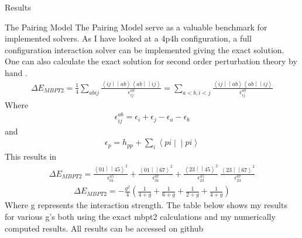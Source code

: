 \documentclass[twoside,english]{uiofysmaster}
\begin{document}
\begin{chapter}{Results}
	
	\begin{section}{The Pairing Model}
		The Pairing Model serve as a valuable benchmark for implemented solvers. As I have looked at a 4p4h configuration, a full configuration interaction solver can be implemented giving the exact solution. One can also calculate the exact solution for second order perturbation theory by hand \cite{Hjorth-Jensen2016}. 
		\begin{align}
			\Delta E_{MBPT2} = \frac{1}{4} \sum_{abij} \frac{\left<ij\middle|\middle|ab\right>\left<ab\middle|\middle|ij\right>}{\epsilon_{ij}^{ab}} = 
			\sum_{a<b,i<j} \frac{\left<ij\middle|\middle|ab\right>\left<ab\middle|\middle|ij\right>}{\epsilon_{ij}^{ab}}
		\end{align}
		Where 
		\begin{align}
			\epsilon_{ij}^{ab} = \epsilon_i + \epsilon_j - \epsilon_a - \epsilon_b
		\end{align}
		and
		\begin{align}
			\epsilon_p = h_{pp} + \sum_i \left<pi\middle|\middle|pi\right>
		\end{align}
		This results in
		\begin{align}
			\Delta E_{MBPT2} = \frac{\left<01\middle|\middle|45\right>^2}{\epsilon_{01}^{45} } + \frac{\left<01\middle|\middle|67\right>^2}{\epsilon_{01}^{67} }
							  +\frac{\left<23\middle|\middle|45\right>^2}{\epsilon_{23}^{45} } \ \frac{\left<23\middle|\middle|67\right>^2}{\epsilon_{23}^{67} }
		\end{align}
		\begin{align}
			\Delta E_{MBPT2} = -\frac{g^2}{4} \left( \frac{1}{4+g} + \frac{1}{6+g} + \frac{1}{2+g} + \frac{1}{4+g} \right)
		\end{align}
		Where g represents the interaction strength. The table below shows my results for various g's both using the exact mbpt2 calculations and my numerically computed results. All results can be accessed on github \cite{WholmenGithub}


\end{section}
\end{chapter}
\end{document}
